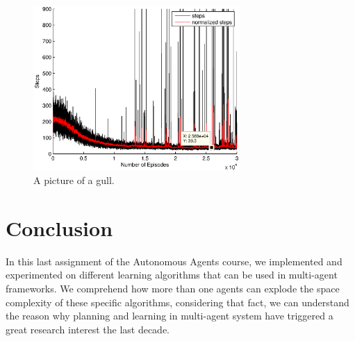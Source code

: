 \documentclass[a4paper,11pt]{article}
\begin{document}
~
\begin{figure}[ht!]
  \centering
    \includegraphics[width=0.7\textwidth]{figures/w070701002.eps}
        \caption{A picture of a gull.}
    \label{w114}
\end{figure}

\section{Conclusion}
In this last assignment of the Autonomous Agents course, we implemented and experimented on different learning algorithms that can be used in multi-agent frameworks. We comprehend how more than one agents can explode the space complexity of these specific algorithms, considering that fact, we can understand the reason why planning and learning in multi-agent system have triggered a great research interest the last decade.
\end{document}
